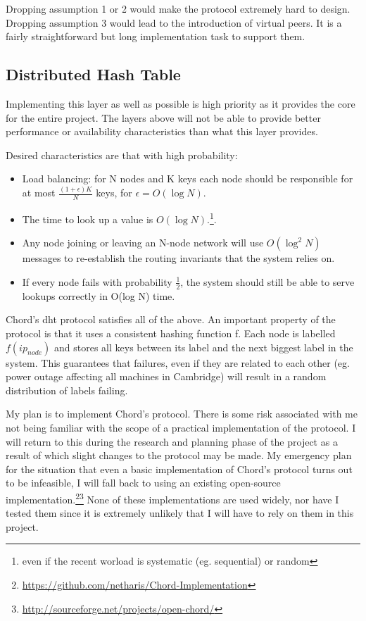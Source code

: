 \documentclass[12pt]{article}
\begin{document}
Dropping assumption 1 or 2 would make the protocol extremely hard to design. Dropping assumption 3 would lead to the introduction of virtual peers.\cite{dabekcfs}\cite{chord} It is a fairly straightforward but long implementation task to support them.

\subsection{Distributed Hash Table}
Implementing this layer as well as possible is high priority as it provides the core for the entire project. The layers above will not be able to provide better performance or availability characteristics than what this layer provides.

Desired characteristics are that with high probability:
\begin{itemize}
\item{Load balancing: for N nodes and K keys each node should be responsible for at most $\frac{(1+\epsilon)K}{N}$ keys, for $\epsilon=O(\log N)$.}
\item{The time to look up a value is $O(\log N)$.\footnote{even if the recent worload is systematic (eg. sequential) or random}.}
\item{Any node joining or leaving an N-node network will use $O(\log^2 N)$ messages to re-establish the routing invariants that the system relies on.}
\item{If every node fails with probability $\frac{1}{2}$, the system should still be able to serve lookups correctly in O(log N) time.}
\end{itemize}

Chord's \gls{dht} protocol satisfies all of the above. \cite{chord} An important property of the protocol is that it uses a consistent hashing function f. Each node is labelled $f(ip_{node})$ and stores all keys between its label and the next biggest label in the system. This guarantees that failures, even if they are related to each other (eg. power outage affecting all machines in Cambridge) will result in a random distribution of labels failing.

My plan is to implement Chord's protocol. There is some risk associated with me not being familiar with the scope of a practical implementation of the protocol. I will return to this during the research and planning phase of the project as a result of which slight changes to the protocol may be made. My emergency plan for the situation that even a basic implementation of Chord's protocol turns out to be infeasible, I will fall back to using an existing open-source implementation.\footnote{\url{https://github.com/netharis/Chord-Implementation}}\footnote{\url{http://sourceforge.net/projects/open-chord/}} None of these implementations are used widely, nor have I tested them since it is extremely unlikely that I will have to rely on them in this project.
\end{document}
